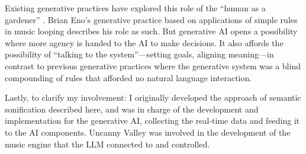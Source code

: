 Existing generative practices have explored this role of the “human as a gardener” \cite{Eno2020-ip}. Brian Eno’s generative practice based on applications of simple rules in music looping describes his role as such. But generative AI opens a possibility where more agency is handed to the AI to make decisions. It also affords the possibility of “talking to the system”—setting goals, aligning meaning—in contrast to previous generative practices where the generative system was a blind compounding of rules that afforded no natural language interaction.

Lastly, to clarify my involvement: I originally developed the approach of semantic sonification described here, and was in charge of the development and implementation for the generative AI, collecting the real-time data and feeding it to the AI components. Uncanny Valley was involved in the development of the music engine that the LLM connected to and controlled.







